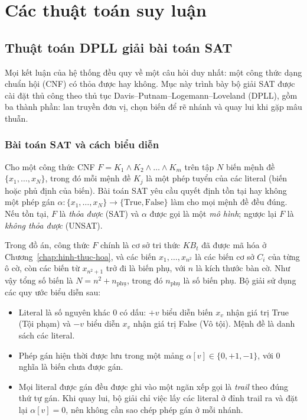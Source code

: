 \chapter{Các thuật toán suy luận}
\label{chap:cac-thuat-toan}

\section{Thuật toán DPLL giải bài toán SAT}
\label{sec:thuat-toan-dpll}

Mọi kết luận của hệ thống đều quy về một câu hỏi duy nhất: một công thức dạng chuẩn hội (CNF) có thỏa được hay không. Mục này trình bày bộ giải SAT được cài đặt thủ công theo thủ tục Davis--Putnam--Logemann--Loveland (DPLL), gồm ba thành phần: lan truyền đơn vị, chọn biến để rẽ nhánh và quay lui khi gặp mâu thuẫn.

\subsection{Bài toán SAT và cách biểu diễn}
\label{subsec:bai-toan-sat}

Cho một công thức CNF $F = K_1 \land K_2 \land \dots \land K_m$ trên tập $N$ biến mệnh đề $\{x_1, \dots, x_N\}$, trong đó mỗi mệnh đề $K_j$ là một phép tuyển của các literal (biến hoặc phủ định của biến). Bài toán SAT yêu cầu quyết định tồn tại hay không một phép gán $\alpha : \{x_1,\dots,x_N\} \to \{\text{True}, \text{False}\}$ làm cho mọi mệnh đề đều đúng. Nếu tồn tại, $F$ là \emph{thỏa được} (SAT) và $\alpha$ được gọi là một \emph{mô hình}; ngược lại $F$ là \emph{không thỏa được} (UNSAT).

Trong đồ án, công thức $F$ chính là cơ sở tri thức $KB_t$ đã được mã hóa ở Chương~\ref{chap:hinh-thuc-hoa}, và các biến $x_1, \dots, x_{n^2}$ là các biến cơ sở $C_i$ của từng ô cờ, còn các biến từ $x_{n^2+1}$ trở đi là biến phụ, với $n$ là kích thước bàn cờ. Như vậy tổng số biến là $N = n^2 + n_{\text{phụ}}$, trong đó $n_{\text{phụ}}$ là số biến phụ. Bộ giải sử dụng các quy ước biểu diễn sau:
\begin{itemize}
    \item Literal là số nguyên khác 0 có dấu: $+v$ biểu diễn biến $x_v$ nhận giá trị True (Tội phạm) và $-v$ biểu diễn $x_v$ nhận giá trị False (Vô tội). Mệnh đề là danh sách các literal.
    \item Phép gán hiện thời được lưu trong một mảng $\alpha[v] \in \{0, +1, -1\}$, với $0$ nghĩa là biến chưa được gán.
    \item Mọi literal được gán đều được ghi vào một ngăn xếp gọi là \emph{trail} theo đúng thứ tự gán. Khi quay lui, bộ giải chỉ việc lấy các literal ở đỉnh trail ra và đặt lại $\alpha[v] = 0$, nên không cần sao chép phép gán ở mỗi nhánh.
\end{itemize}


